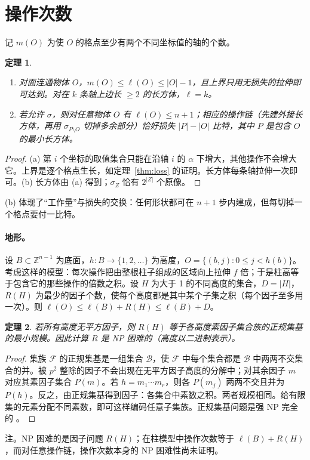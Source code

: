 \documentclass[11pt,a4paper]{article}
\theoremstyle{plain}
\newtheorem{theorem}{定理}
\theoremstyle{definition}
\theoremstyle{remark}
\newcommand{\Z}{\mathbb{Z}}
\begin{document}
\section{操作次数}\label{sec:count}

记 $m(O)$ 为使 $O$ 的格点至少有两个不同坐标值的轴的个数。

\begin{theorem}\label{thm:bounds}
\begin{enumerate}[label=\upshape(\alph*)]
\item 对面连通物体 $O$，$m(O)\le\ell(O)\le|O|-1$，且上界只用无损失的拉伸即可达到。对在 $k$ 条轴上边长 $\ge2$ 的长方体，$\ell=k$。
\item 若允许 $\sigma$，则对任意物体 $O$ 有 $\ell(O)\le n+1$；相应的操作链（先建外接长方体，再用 $\sigma_{P\setminus O}$ 切掉多余部分）恰好损失 $|P|-|O|$ 比特，其中 $P$ 是包含 $O$ 的最小长方体。
\end{enumerate}
\end{theorem}
\begin{proof}
(a) 第 $i$ 个坐标的取值集合只能在沿轴 $i$ 的 $\alpha$ 下增大，其他操作不会增大它。上界是逐个格点生长，如定理~\ref{thm:loss} 的证明。长方体每条轴拉伸一次即可。(b) 长方体由 (a) 得到；$\sigma_Z$ 恰有 $2^{|Z|}$ 个原像。
\end{proof}

(b) 体现了“工作量”与损失的交换：任何形状都可在 $n+1$ 步内建成，但每切掉一个格点要付一比特。

\paragraph{地形。} 设 $B\subset\Z^{n-1}$ 为底面，$h\colon B\to\{1,2,\dots\}$ 为高度，$O=\{(b,j):0\le j<h(b)\}$。考虑这样的模型：每次操作把由整根柱子组成的区域向上拉伸 $f$ 倍；于是柱高等于包含它的那些操作的倍数之积。设 $H$ 为大于 1 的不同高度的集合，$D=|H|$，$R(H)$ 为最少的因子个数，使每个高度都是其中某个子集之积（每个因子至多用一次）。则 $\ell(O)\le \ell(B)+R(H)\le\ell(B)+D$。

\begin{theorem}\label{thm:np}
若所有高度无平方因子，则 $R(H)$ 等于各高度素因子集合族的正规集基的最小规模。因此计算 $R$ 是 NP 困难的（高度以二进制表示）。
\end{theorem}
\begin{proof}
集族 $\mathcal F$ 的正规集基是一组集合 $\mathcal B$，使 $\mathcal F$ 中每个集合都是 $\mathcal B$ 中两两不交集合的并。被 $p^2$ 整除的因子不会出现在无平方因子高度的分解中；对其余因子 $m$ 对应其素因子集合 $P(m)$。若 $h=m_1\cdots m_r$，则各 $P(m_j)$ 两两不交且并为 $P(h)$。反之，由正规集基得到因子：各集合中素数之积。两者规模相同。给有限集的元素分配不同素数，即可这样编码任意子集族。正规集基问题是强 NP 完全的 \cite{jiang}。
\end{proof}
\noindent 注。NP 困难的是因子问题 $R(H)$；在柱模型中操作次数等于 $\ell(B)+R(H)$，而对任意操作链，操作次数本身的 NP 困难性尚未证明。
\end{document}
